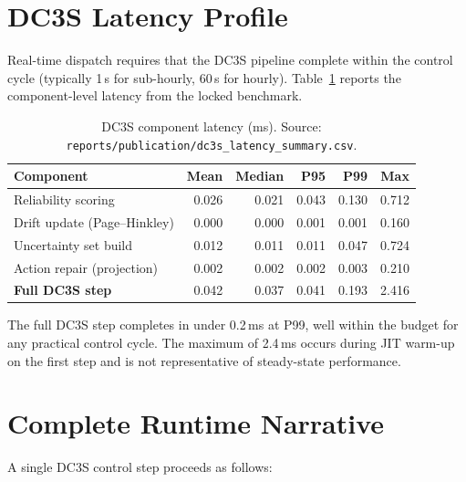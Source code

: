 \section{DC3S Latency Profile}

Real-time dispatch requires that the DC3S pipeline complete within the
control cycle (typically 1\,s for sub-hourly, 60\,s for hourly).
Table~\ref{tab:dc3s-latency} reports the component-level latency from the
locked benchmark.

\begin{table}[ht]
\centering
\caption{DC3S component latency (ms).  Source:
\texttt{reports/publication/dc3s\_latency\_summary.csv}.}
\label{tab:dc3s-latency}
\begin{tabular}{lrrrrr}
\toprule
\textbf{Component} & \textbf{Mean} & \textbf{Median} & \textbf{P95} &
  \textbf{P99} & \textbf{Max} \\
\midrule
Reliability scoring          & 0.026 & 0.021 & 0.043 & 0.130 & 0.712 \\
Drift update (Page--Hinkley) & 0.000 & 0.000 & 0.001 & 0.001 & 0.160 \\
Uncertainty set build        & 0.012 & 0.011 & 0.011 & 0.047 & 0.724 \\
Action repair (projection)   & 0.002 & 0.002 & 0.002 & 0.003 & 0.210 \\
\midrule
\textbf{Full DC3S step}      & 0.042 & 0.037 & 0.041 & 0.193 & 2.416 \\
\bottomrule
\end{tabular}
\end{table}

The full DC3S step completes in under 0.2\,ms at P99, well within the
budget for any practical control cycle.  The maximum of 2.4\,ms occurs
during JIT warm-up on the first step and is not representative of
steady-state performance.

\section{Complete Runtime Narrative}
\label{sec:runtime-narrative}

A single DC3S control step proceeds as follows:

